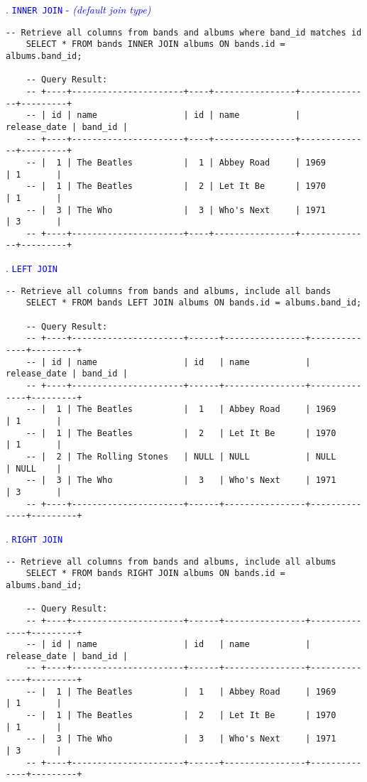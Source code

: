 . \textcolor{blue}{\texttt{INNER JOIN} - \textit{(default join type)}}

\begin{lstlisting}[style=sql]
    -- Retrieve all columns from bands and albums where band_id matches id
    SELECT * FROM bands INNER JOIN albums ON bands.id = albums.band_id;

    -- Query Result:
    -- +----+----------------------+----+----------------+--------------+---------+
    -- | id | name                 | id | name           | release_date | band_id |
    -- +----+----------------------+----+----------------+--------------+---------+
    -- |  1 | The Beatles          |  1 | Abbey Road     | 1969         | 1       |
    -- |  1 | The Beatles          |  2 | Let It Be      | 1970         | 1       |
    -- |  3 | The Who              |  3 | Who's Next     | 1971         | 3       |
    -- +----+----------------------+----+----------------+--------------+---------+
\end{lstlisting}

. \textcolor{blue}{\texttt{LEFT JOIN}}
\begin{lstlisting}[style=sql]
    -- Retrieve all columns from bands and albums, include all bands
    SELECT * FROM bands LEFT JOIN albums ON bands.id = albums.band_id;

    -- Query Result:
    -- +----+----------------------+------+----------------+--------------+---------+
    -- | id | name                 | id   | name           | release_date | band_id |
    -- +----+----------------------+------+----------------+--------------+---------+
    -- |  1 | The Beatles          |  1   | Abbey Road     | 1969         | 1       |
    -- |  1 | The Beatles          |  2   | Let It Be      | 1970         | 1       |
    -- |  2 | The Rolling Stones   | NULL | NULL           | NULL         | NULL    |
    -- |  3 | The Who              |  3   | Who's Next     | 1971         | 3       |
    -- +----+----------------------+------+----------------+--------------+---------+
\end{lstlisting}

. \textcolor{blue}{\texttt{RIGHT JOIN}}
\begin{lstlisting}[style=sql]
    -- Retrieve all columns from bands and albums, include all albums
    SELECT * FROM bands RIGHT JOIN albums ON bands.id = albums.band_id;

    -- Query Result:
    -- +----+----------------------+------+----------------+--------------+---------+
    -- | id | name                 | id   | name           | release_date | band_id |
    -- +----+----------------------+------+----------------+--------------+---------+
    -- |  1 | The Beatles          |  1   | Abbey Road     | 1969         | 1       |
    -- |  1 | The Beatles          |  2   | Let It Be      | 1970         | 1       |
    -- |  3 | The Who              |  3   | Who's Next     | 1971         | 3       |
    -- +----+----------------------+------+----------------+--------------+---------+
    
\end{lstlisting}
